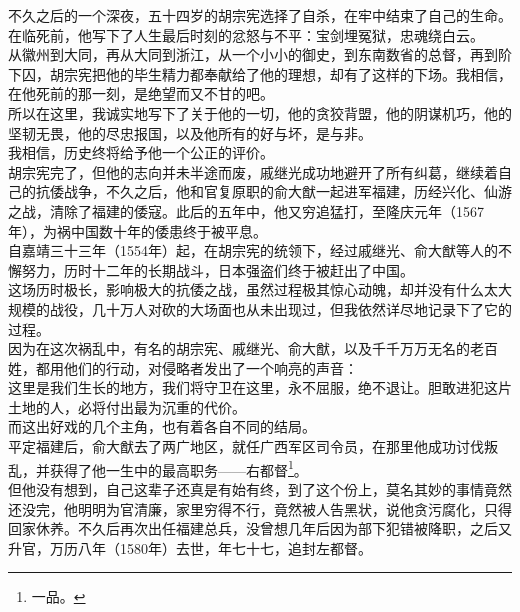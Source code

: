\begin{multicols}{\theparacolNo}
不久之后的一个深夜，五十四岁的胡宗宪选择了自杀，在牢中结束了自己的生命。\\

在临死前，他写下了人生最后时刻的忿怒与不平：宝剑埋冤狱，忠魂绕白云。\\

从徽州到大同，再从大同到浙江，从一个小小的御史，到东南数省的总督，再到阶下囚，胡宗宪把他的毕生精力都奉献给了他的理想，却有了这样的下场。我相信，在他死前的那一刻，是绝望而又不甘的吧。\\

所以在这里，我诚实地写下了关于他的一切，他的贪狡背盟，他的阴谋机巧，他的坚韧无畏，他的尽忠报国，以及他所有的好与坏，是与非。\\

我相信，历史终将给予他一个公正的评价。\\

胡宗宪完了，但他的志向并未半途而废，戚继光成功地避开了所有纠葛，继续着自己的抗倭战争，不久之后，他和官复原职的俞大猷一起进军福建，历经兴化、仙游之战，清除了福建的倭寇。此后的五年中，他又穷追猛打，至隆庆元年（1567年），为祸中国数十年的倭患终于被平息。\\

自嘉靖三十三年（1554年）起，在胡宗宪的统领下，经过戚继光、俞大猷等人的不懈努力，历时十二年的长期战斗，日本强盗们终于被赶出了中国。\\

这场历时极长，影响极大的抗倭之战，虽然过程极其惊心动魄，却并没有什么太大规模的战役，几十万人对砍的大场面也从未出现过，但我依然详尽地记录下了它的过程。\\

因为在这次祸乱中，有名的胡宗宪、戚继光、俞大猷，以及千千万万无名的老百姓，都用他们的行动，对侵略者发出了一个响亮的声音：\\

这里是我们生长的地方，我们将守卫在这里，永不屈服，绝不退让。胆敢进犯这片土地的人，必将付出最为沉重的代价。\\

而这出好戏的几个主角，也有着各自不同的结局。\\

平定福建后，俞大猷去了两广地区，就任广西军区司令员，在那里他成功讨伐叛乱，并获得了他一生中的最高职务——右都督\footnote{一品。}。\\

但他没有想到，自己这辈子还真是有始有终，到了这个份上，莫名其妙的事情竟然还没完，他明明为官清廉，家里穷得不行，竟然被人告黑状，说他贪污腐化，只得回家休养。不久后再次出任福建总兵，没曾想几年后因为部下犯错被降职，之后又升官，万历八年（1580年）去世，年七十七，追封左都督。\\


\end{multicols}
